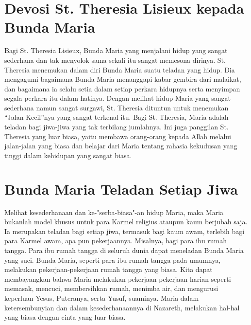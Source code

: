 \section*{Devosi St. Theresia Lisieux kepada Bunda Maria}



Bagi St. Theresia Lisieux, Bunda Maria yang menjalani hidup yang sangat sederhana dan tak menyolok sama sekali itu sangat memesona dirinya. St. Theresia menemukan dalam diri Bunda Maria suatu teladan yang hidup. Dia mengagumi bagaimana Bunda Maria menanggapi kabar gembira dari malaikat, dan bagaimana ia selalu setia dalam setiap perkara hidupnya serta menyimpan segala perkara itu dalam hatinya. Dengan melihat hidup Maria yang sangat sederhana namun sangat surgawi, St. Theresia dituntun untuk menemukan ``Jalan Kecil''nya yang sangat terkenal itu. Bagi St. Theresia, Maria adalah teladan bagi jiwa-jiwa yang tak terbilang jumlahnya. Ini juga panggilan St. Theresia yang luar biasa, yaitu membawa orang-orang kepada Allah melalui jalan-jalan yang biasa dan belajar dari Maria tentang rahasia kekudusan yang tinggi dalam kehidupan yang sangat biasa.

\section*{Bunda Maria Teladan Setiap Jiwa}

Melihat kesederhanaan dan ke-"serba-biasa"-an hidup Maria, maka Maria bukanlah model khusus untuk para Karmel religius ataupun kaum berjubah saja. Ia merupakan teladan bagi setiap jiwa, termasuk bagi kaum awam, terlebih bagi para Karmel awam, apa pun pekerjaannya. Misalnya, bagi para ibu rumah tangga. Para ibu rumah tangga di seluruh dunia dapat meneladan Bunda Maria yang suci. Bunda Maria, seperti para ibu rumah tangga pada umumnya, melakukan pekerjaan-pekerjaan rumah tangga yang biasa. Kita dapat membayangkan bahwa Maria melakukan pekerjaan-pekerjaan harian seperti memasak, mencuci, membersihkan rumah, menimba air, dan mengurusi keperluan Yesus, Puteranya, serta Yusuf, suaminya. Maria dalam ketersembunyian dan dalam kesederhanaannya di Nazareth, melakukan hal-hal yang biasa dengan cinta yang luar biasa. 

